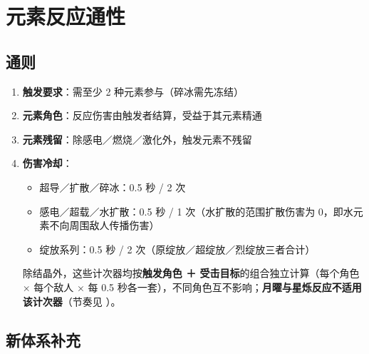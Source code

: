 \medskip

\section{元素反应通性}

\subsection{通则}\label{sec:common}

\begin{enumerate}
\item \textbf{触发要求}：需至少 2 种元素参与（碎冰需先冻结）
\item \textbf{元素角色}：反应伤害由触发者结算，受益于其元素精通
\item \textbf{元素残留}：除感电／燃烧／激化外，触发元素不残留
\item \textbf{伤害冷却}：
\begin{itemize}
\item 超导／扩散／碎冰：0.5 秒 / 2 次
\item 感电／超载／水扩散：0.5 秒 / 1 次（水扩散的范围扩散伤害为 0，即水元素不向周围敌人传播伤害）
\item 绽放系列：0.5 秒 / 2 次（原绽放／超绽放／烈绽放三者合计）
\end{itemize}
除结晶外，这些计次器均按\textbf{触发角色 ＋ 受击目标}的组合独立计算（每个角色 × 每个敌人 × 每 0.5 秒各一套），不同角色互不影响；\textbf{月曜与星烁反应不适用该计次器}（节奏见 ）。
\end{enumerate}

\subsection{新体系补充}\label{sec:newrules}

